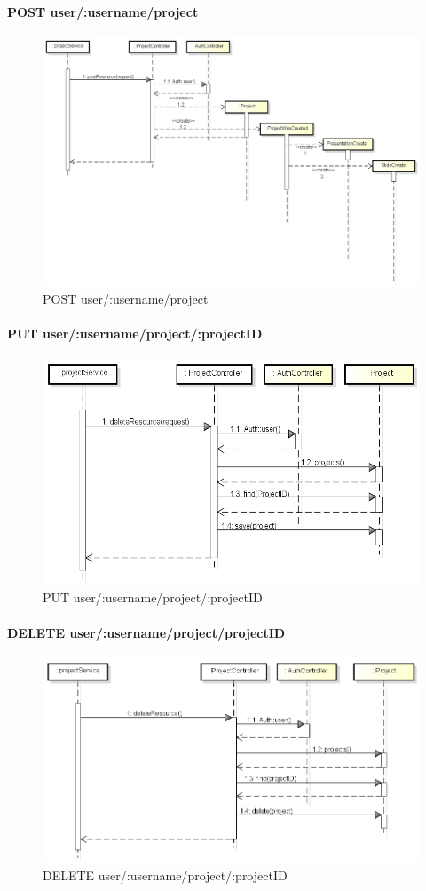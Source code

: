 \paragraph{POST user/:username/project}
\begin{figure}[h]
	\centering
	\includegraphics[width=0.7\linewidth]{img/POST_project}
	\caption[POST user/:username/project]{POST user/:username/project}
	\label{fig:POST user/:username/project}
\end{figure}

\newpage

\paragraph{PUT user/:username/project/:projectID}
\begin{figure}[h]
	\centering
	\includegraphics[width=0.7\linewidth]{img/PUT_project}
	\caption[PUT user/:username/project/:projectID]{PUT user/:username/project/:projectID}
	\label{fig:PUT user/:username/project/projectID}
\end{figure}

\paragraph{DELETE user/:username/project/projectID}
\begin{figure}[h]
	\centering
	\includegraphics[width=0.7\linewidth]{img/DELETE_project}
	\caption[DELETE user/:username/project/:projectID]{DELETE user/:username/project/:projectID}
	\label{fig:DELETE user/:username/project/:projectID}
\end{figure}